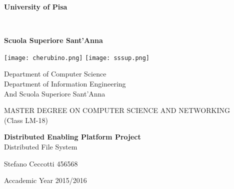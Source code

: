 \documentclass[12pt, a4paper, oneside] {book}
\begin{document}
\begin{titlepage}

\begin{center}

\begin{LARGE}\textbf{\sc University of Pisa}\end{LARGE}\\
\vspace{0.3cm}
\begin{LARGE}\textbf{\sc Scuola Superiore Sant'Anna}\end{LARGE}

\vspace{2.0cm}

\texttt{[image: cherubino.png]}
\hspace{1.0cm}
\texttt{[image: sssup.png]}

\vspace{1.0cm}

\begin{Large}
\sc Department of Computer Science\\
\sc Department of Information Engineering\\
\vspace{0.28cm}
\sc And Scuola Superiore Sant'Anna
\end{Large}

\vspace{0.8cm}

\large MASTER DEGREE ON COMPUTER SCIENCE AND NETWORKING\\
(Class LM-18)

\vspace{1.4cm}

{\bfseries \LARGE Distributed Enabling Platform Project}\\[0.3cm]
{\sc \Large Distributed File System}\\[1.7cm]

\begin{LARGE}
Stefano Ceccotti 456568\\
\end{LARGE}

\vspace{0.32cm}

\begin{large}
Accademic Year 2015/2016
\end{large}

\end{center}

\end{titlepage}
\end{document}
